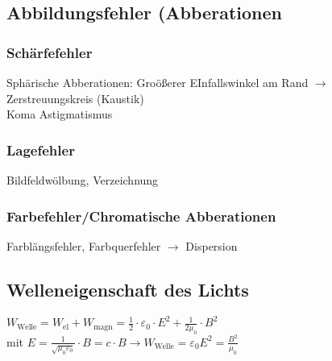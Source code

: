 \documentclass[fs, footer]{latex4ei}
\begin{document}
\begin{multicols*}{4}
\subsection{Abbildungsfehler (Abberationen} %
\subsubsection{Schärfefehler}
Sphärische Abberationen: Groößerer EInfallswinkel am Rand $\rightarrow$ Zerstreuungskreis (Kaustik)\\
Koma
Astigmatismus
\subsubsection{Lagefehler}
Bildfeldwölbung, Verzeichnung
\subsubsection{Farbefehler/Chromatische Abberationen}
Farblängsfehler, Farbquerfehler $\rightarrow$ Dispersion\\

\subsection{Welleneigenschaft des Lichts}
$W_{\text{Welle}} = W_{\text{el}}+W_{\text{magn}} = \frac{1}{2}\cdot\varepsilon_0\cdot E^2 + \frac{1}{2\mu_0}\cdot B^2$\\
mit $E = \frac{1}{\sqrt{\mu_0\varepsilon_0}}\cdot B = c\cdot B \rightarrow W_{\text{Welle}} = \varepsilon_0E^2 = \frac{B^2}{\mu_0}$\\


 







	
\end{multicols*}
\end{document}
